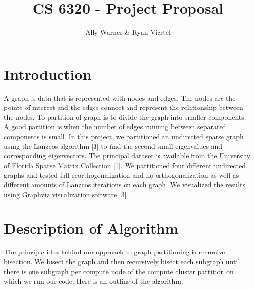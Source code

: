 \documentclass[11pt, oneside]{article}   	%
\title{CS 6320 - Project Proposal}
\author{Ally Warner \& Ryan Viertel}
\begin{document}
\maketitle

\section{Introduction}
A graph is data that is represented with nodes and edges. The nodes are the points of interest and the edges connect and represent the relationship between the nodes. To partition of graph is to divide the graph into smaller components. A good partition is when the number of edges running between separated components is small. In this project, we partitioned an undirected sparse graph using the Lanzcos algorithm [3] to find the second small eigenvalues and corresponding eigenvectors.  The principal dataset is available from the University of Florida Sparse Matrix Collection [1]. We partitioned four different undirected graphs and tested full reorthogonalization and no orthogonalization as well as different amounts of Lanzcos iterations on each graph. We visualized the results using Graphviz visualization software [3].

\section{Description of Algorithm}
The principle idea behind our approach to graph partitioning is recursive bisection. We bisect the graph and then recursively bisect each subgraph until there is one subgraph per compute node of the compute cluster partition on which we run our code. Here is an outline of the algorithm.
\end{document}
